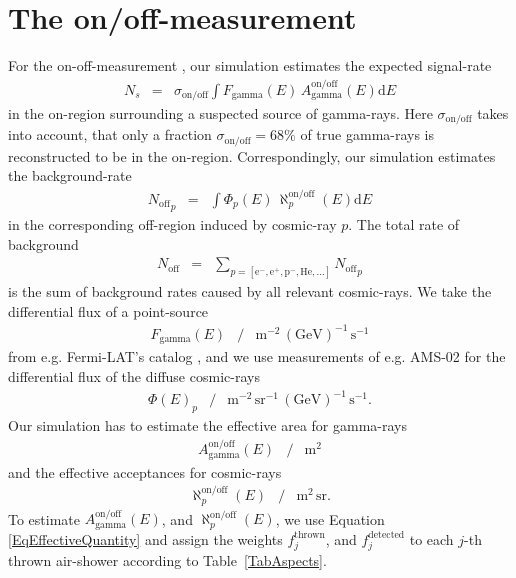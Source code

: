 \documentclass[a4paper,12pt,oneside]{article}
\begin{document}
\section{The on/off-measurement}
\label{SecOnOffMeasurement}
%
For the on-off-measurement \cite{li1983analysis}, our simulation estimates the expected signal-rate
%
\begin{eqnarray}
N_s &=& \sigma_\text{on/off} \int F_\text{gamma}(E)\,A_\text{gamma}^\text{on/off}(E) \mathrm{d}E
\label{EqSignalRate}
\end{eqnarray}
%
in the on-region surrounding a suspected source of gamma-rays.
%
Here $\sigma_\text{on/off}$ takes into account, that only a fraction $\sigma_\text{on/off} = 68\%$ of true gamma-rays is reconstructed to be in the on-region.
%
Correspondingly, our simulation estimates the background-rate
%
\begin{eqnarray*}
{N_\text{off}}_p &=& \int \Phi_p(E)\,\aleph_p^\text{on/off}(E) \mathrm{d}E
\end{eqnarray*}
%
in the corresponding off-region induced by cosmic-ray $p$.
%
The total rate of background
%
\begin{eqnarray*}
N_\text{off} &=& \sum_{p = [\text{e}^-, \text{e}^+, \text{p}^-, \text{He}, \dots]} {N_\text{off}}_p
\end{eqnarray*}
%
is the sum of background rates caused by all relevant cosmic-rays.
%
We take the differential flux of a point-source
%
\begin{eqnarray*}
F_\text{gamma}(E) &/& \mathrm{m}^{-2}\,\mathrm{(GeV)}^{-1}\,\mathrm{s}^{-1}
\end{eqnarray*}
%
from e.g. Fermi-LAT's catalog \cite{acero2015fermi3fgl}, and we use measurements of e.g. \mbox{AMS-02} \cite{aguilar2015precision, aguilar2014precision} for the differential flux of the diffuse cosmic-rays
%
\begin{eqnarray*}
\Phi(E)_p &/& \mathrm{m}^{-2}\,\mathrm{sr}^{-1}\,\mathrm{(GeV)}^{-1}\,\mathrm{s}^{-1}.
\end{eqnarray*}
%
Our simulation has to estimate the effective area for gamma-rays
%
\begin{eqnarray*}
A_\text{gamma}^\text{on/off}(E) &/& \text{m}^2
\end{eqnarray*}
%
and the effective acceptances for cosmic-rays
%
\begin{eqnarray*}
\aleph_p^\text{on/off}(E) &/& \text{m}^2\,\text{sr}.
\end{eqnarray*}
%
To estimate $A_\text{gamma}^\text{on/off}(E)$, and $\aleph_p^\text{on/off}(E)$, we use Equation \ref{EqEffectiveQuantity} and assign the weights $f_j^\text{thrown}$, and $f_j^\text{detected}$ to each $j$-th thrown air-shower according to \mbox{Table \ref{TabAspects}}.
%
\end{document}
